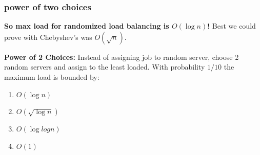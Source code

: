 \documentclass[handout,compress]{beamer}
\begin{document}
\begin{frame}
	\frametitle{power of two choices}
	\begin{center}\alert{\textbf{So max load for randomized load balancing is $O(\log n)$!}} Best we could prove with Chebyshev's was $O(\sqrt{n})$. \end{center}
	
	\textbf{Power of 2 Choices:} Instead of assigning job to random server, choose 2 random servers and assign to the least loaded. With probability $1/10$ the maximum load is bounded by:
	\begin{enumerate}[label=(\alph*)]
		\item $O(\log n)$
		\item $O(\sqrt{\log n})$
		\item $O(\log log n)$
		\item $O(1)$
	\end{enumerate}
\end{frame}
\end{document}

